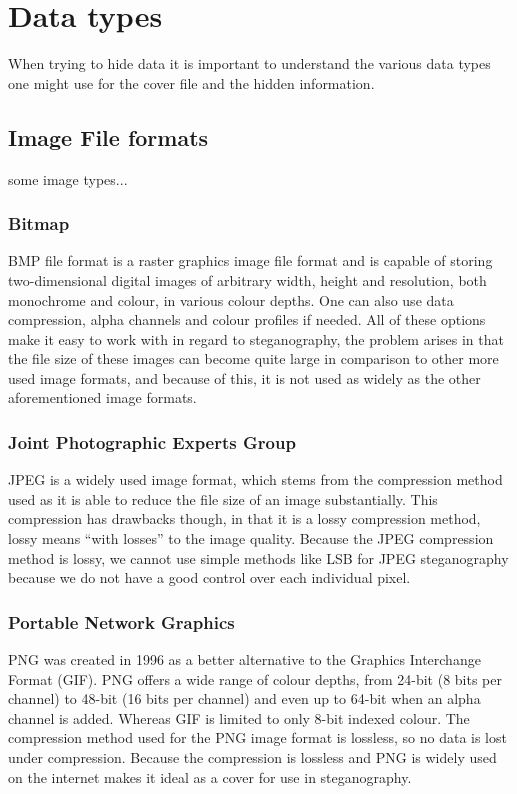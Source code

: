 \section{Data types}
When trying to hide data it is important to understand the various data types one might use for the cover file and the hidden information.

\subsection{Image File formats}
some image types...

\subsubsection*{Bitmap}
BMP file format is a raster graphics image file format and is capable of storing two-dimensional digital images of arbitrary width, height and resolution, both monochrome and colour, in various colour depths. 
One can also use data compression, alpha channels and colour profiles if needed.
All of these options make it easy to work with in regard to steganography, the problem arises in that the file size of these images can become quite large in comparison to other more used image formats, and because of this, it is not used as widely as the other aforementioned image formats.

\subsubsection*{Joint Photographic Experts Group}
JPEG is a widely used image format, which stems from the compression method used as it is able to reduce the file size of an image substantially.
This compression has drawbacks though, in that it is a lossy compression method, lossy means ``with losses'' to the image quality.
Because the JPEG compression method is lossy, we cannot use simple methods like LSB for JPEG steganography because we do not have a good control over each individual pixel.
\iffalse{TODO: need to specify which countermeasures and rewrite the ending}\fi


\subsubsection*{Portable Network Graphics}
PNG was created in 1996 as a better alternative to the Graphics Interchange Format (GIF).
PNG offers a wide range of colour depths, from 24-bit (8 bits per channel) to 48-bit (16 bits per channel) and even up to 64-bit when an alpha channel is added.
Whereas GIF is limited to only 8-bit indexed colour.
The compression method used for the PNG image format is lossless, so no data is lost under compression.
Because the compression is lossless and PNG is widely used on the internet makes it ideal as a cover for use in steganography.



